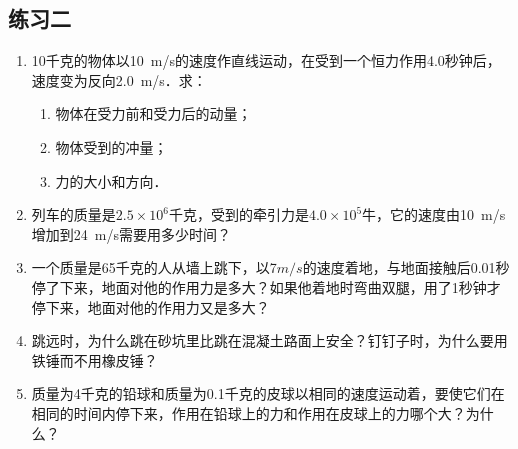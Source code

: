 \subsection*{练习二}
\begin{enumerate}
    \item 10千克的物体以\qty{10}{m/s}的速度作直线运动，在受到一个恒力作用4.0秒钟后，速度变为反向\qty{2.0}{m/s}．求：
          \begin{enumerate}
              \item 物体在受力前和受力后的动量；
              \item 物体受到的冲量；
              \item 力的大小和方向．
          \end{enumerate}
    \item 列车的质量是$2.5\times 10^6$千克，受到的牵引力是$4.0\times
              10^5$牛，它的速度由\qty{10}{m/s}增加到\qty{24}{m/s}需要用多少时间？
    \item 一个质量是65千克的人从墙上跳下，以7$\si{m/s}$的速度着地，与地面接触后0.01秒停了下来，地面对他的作用力是多大？如果他着地时弯曲双腿，用了1秒钟才停下来，地面对他的作用力又是多大？
    \item 跳远时，为什么跳在砂坑里比跳在混凝土路面上安全？钉钉子时，为什么要用铁锤而不用橡皮锤？
    \item 质量为4千克的铅球和质量为0.1千克的皮球以相同的速度运动着，要使它们在相同的时间内停下来，作用在铅球上的力和作用在皮球上的力哪个大？为什么？
\end{enumerate}
\newpage
